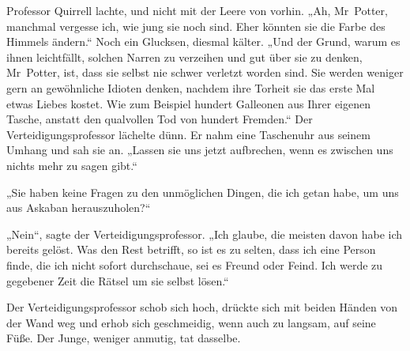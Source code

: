 Professor Quirrell lachte, und nicht mit der Leere von vorhin.
„Ah, Mr~Potter, manchmal vergesse ich, wie jung sie noch sind. Eher könnten sie die Farbe des Himmels ändern.“ Noch ein Glucksen, diesmal kälter.
„Und der Grund, warum es ihnen leichtfällt, solchen Narren zu verzeihen und gut über sie zu denken, Mr~Potter, ist, dass sie selbst nie schwer verletzt worden sind. Sie werden weniger gern an gewöhnliche Idioten denken, nachdem ihre Torheit sie das erste Mal etwas Liebes kostet. Wie zum Beispiel hundert Galleonen aus Ihrer eigenen Tasche, anstatt den qualvollen Tod von hundert Fremden.“ Der Verteidigungsprofessor lächelte dünn. Er nahm eine Taschenuhr aus seinem Umhang und sah sie an.
„Lassen sie uns jetzt aufbrechen, wenn es zwischen uns nichts mehr zu sagen gibt.“

„Sie haben keine Fragen zu den unmöglichen Dingen, die ich getan habe, um uns aus Askaban herauszuholen?“

„Nein“, sagte der Verteidigungsprofessor.
„Ich glaube, die meisten davon habe ich bereits gelöst. Was den Rest betrifft, so ist es zu selten, dass ich eine Person finde, die ich nicht sofort durchschaue, sei es Freund oder Feind. Ich werde zu gegebener Zeit die Rätsel um sie selbst lösen.“

Der Verteidigungsprofessor schob sich hoch, drückte sich mit beiden Händen von der Wand weg und erhob sich geschmeidig, wenn auch zu langsam, auf seine Füße. Der Junge, weniger anmutig, tat dasselbe.

